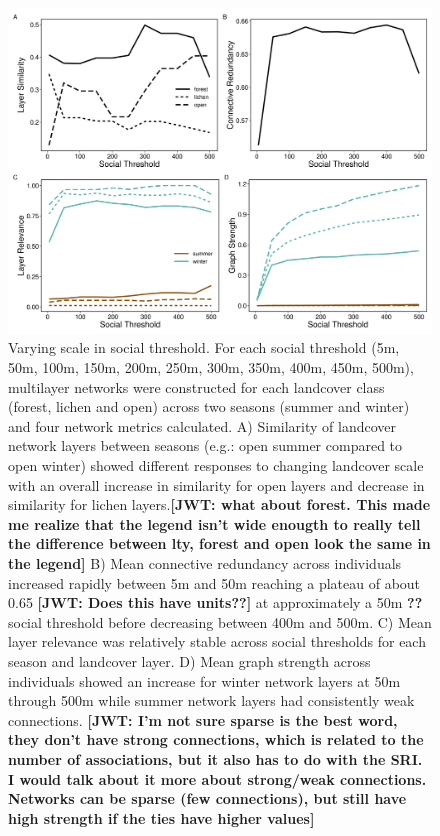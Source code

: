 \documentclass[]{article}
\begin{document}
\begin{figure}
\includegraphics[width=\linewidth]{../graphics/figure-spatialthreshold} \caption{Varying scale in social threshold. For each social threshold (5m, 50m, 100m, 150m, 200m, 250m, 300m, 350m, 400m, 450m, 500m), multilayer networks were constructed for each landcover class (forest, lichen and open) across two seasons (summer and winter) and four network metrics calculated. A) Similarity of landcover network layers between seasons (e.g.: open summer compared to open winter) showed different responses to changing landcover scale with an overall increase in similarity for open layers and decrease in similarity for lichen layers.\textbf{{[}JWT: what about forest. This made me realize that the legend isn't wide enougth to really tell the difference between lty, forest and open look the same in the legend{]}} B) Mean connective redundancy across individuals increased rapidly between 5m and 50m reaching a plateau of about 0.65 \textbf{{[}JWT: Does this have units??{]}} at approximately a 50m \textbf{??} social threshold before decreasing between 400m and 500m. C) Mean layer relevance was relatively stable across social thresholds for each season and landcover layer. D) Mean graph strength across individuals showed an increase for winter network layers at 50m through 500m while summer network layers had consistently weak connections. \textbf{{[}JWT: I'm not sure sparse is the best word, they don't have strong connections, which is related to the number of associations, but it also has to do with the SRI. I would talk about it more about strong/weak connections. Networks can be sparse (few connections), but still have high strength if the ties have higher values{]}}}\label{fig:unnamed-chunk-2}
\end{figure}
\end{document}

